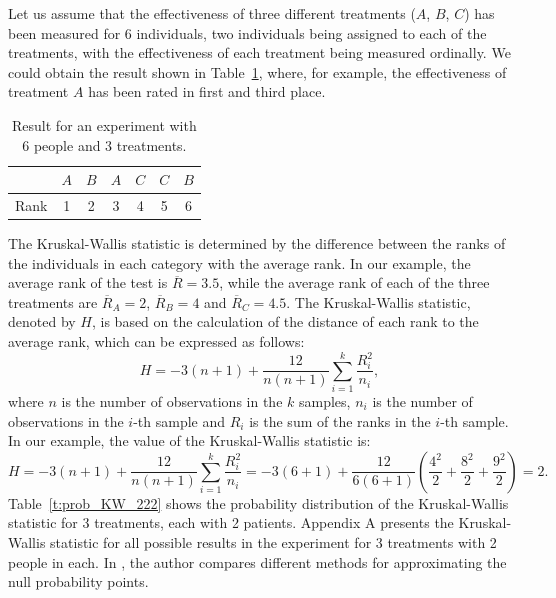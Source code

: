 \begin{exmp} \label{ex:1}
Let us assume that the effectiveness of three different treatments ($A$, $B$, $C$) has been measured for 6 individuals, two individuals being assigned to each of the treatments, with the effectiveness of each treatment being measured ordinally. We could obtain the result shown in Table~\ref{t:example}, where, for example, the effectiveness of treatment $A$ has been rated in first and third place. 
\begin{table}[h]\centering
\begin{tabular}{ccccccc}
 & $A$ & $B$ & $A$ & $C$ & $C$ & $B$ \\ \hline
 Rank & 1 & 2 & 3 & 4 & 5 & 6  \\ \hline 
 \end{tabular}
  \caption{Result for an experiment with 6 people and 3 treatments.}
  \label{t:example}
\end{table}
\end{exmp} 

The Kruskal-Wallis statistic is determined by the difference between the ranks of the individuals in each category with the average rank. In our example, the average rank of the test is $\overline{R}=3.5$, while the average rank of each of the three treatments are $\overline{R}_A=2$, $\overline{R}_B=4$ and $\overline{R}_C=4.5$. The Kruskal-Wallis statistic, denoted by $H$, is based on the calculation of the distance of each rank to the average rank, which can be expressed as follows:
$$ H =  -3(n+1)+\frac{12}{n(n+1)}\sum_{i=1}^k \frac{R_i^2}{n_i},$$
where  $n$ is the number of observations in the $k$ samples, $n_i$ is the number of observations in the $i$-th sample and $R_i$ is the sum of the ranks in the $i$-th sample. In our example, the value of the Kruskal-Wallis statistic is:
$$ H =  -3(n+1)+\frac{12}{n(n+1)}\sum_{i=1}^k \frac{R_i^2}{n_i} = -3(6+1)+\frac{12}{6(6+1)}\left (\frac{4^2}{2} + \frac{8^2}{2} + \frac{9^2}{2}  \right ) = 2. $$
Table~\ref{t:prob_KW_222} shows the probability distribution of the Kruskal-Wallis statistic for 3 treatments, each with 2 patients. Appendix A presents the Kruskal-Wallis statistic for all possible results in the experiment for 3 treatments with 2 people in each. In \cite{Spurrier2003}, the author compares different methods for approximating the null probability points. 

